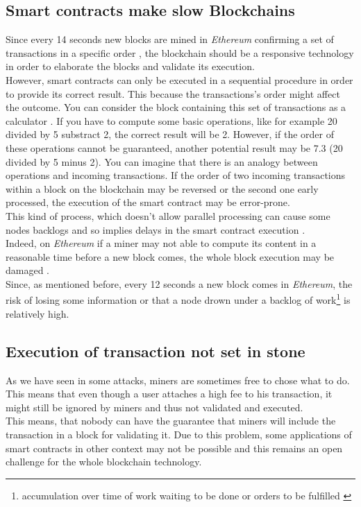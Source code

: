 \subsection{Smart contracts make slow Blockchains}
Since every 14 seconds new blocks are mined in \textit{Ethereum} \cite{sina} confirming a set of transactions in a specific order \cite{challenge3}, the blockchain should be a responsive technology in order to elaborate the blocks and validate its execution. \\
However, smart contracts can only be executed in a sequential procedure \cite{challenge3} in order to provide its correct result. This because the transactions's order might affect the outcome. You can consider the block containing this set of transactions as a calculator \cite{challenge1}. If you have to compute some basic operations, like for example 20 divided by 5 substract 2, the correct result will be 2. However, if the order of these operations cannot be guaranteed, another potential result may be 7.3 (20 divided by 5 minus 2). 
You can imagine that there is an analogy between operations and incoming transactions. If the order of two incoming transactions within a block on the blockchain may be reversed or the second one early processed, the execution of the smart contract may be error-prone. \\
This kind of process, which doesn't allow parallel processing can cause some nodes backlogs and so implies delays in the smart contract execution \cite{challenge1}. \\
Indeed, on \textit{Ethereum} if a miner may not able to compute its content in a reasonable time before a new block comes, the whole block execution may be damaged \cite{challenge1}. \\
Since, as mentioned before, every 12 seconds a new block comes in \textit{Ethereum}, the risk of losing some information or that a node drown under a backlog of work\footnote{accumulation over time of work waiting to be done or orders to be fulfilled \cite{challenge4}} is relatively high.

\subsection{Execution of transaction not set in stone}
As we have seen in some attacks, miners are sometimes free to chose what to do. This means that even though a user attaches a high fee to his transaction, it might still be ignored by miners and thus not validated and executed.\\
This means, that nobody can have the guarantee that miners will include the transaction in a block for validating it.
Due to this problem, some applications of smart contracts in other context may not be possible and this remains an open challenge for the whole blockchain technology. 

